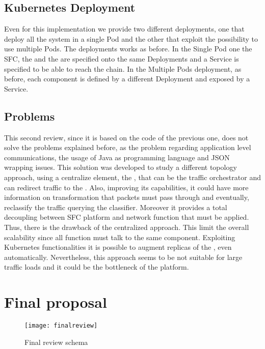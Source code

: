 \subsection{Kubernetes Deployment}
Even for this implementation we provide two different deployments, one that
deploy all the system in a single Pod and the other that exploit the possibility
to use multiple Pods. The deployments works as before. In the Single Pod one the
SFC, the \enchainer{} and the \dispatcher{} are specified onto the same
Deployments and a Service is specified to be able to reach the chain. In the
Multiple Pods deployment, as before, each component is defined by a different
Deployment and exposed by a Service.

\subsection{Problems}
This second review, since it is based on the code of the previous one, does not
solve the problems explained before, as the problem regarding application
level communications, the usage of Java as programming language and JSON
wrapping issues. This solution was developed to study a different topology
approach, using a centralize element, the \dispatcher{}, that can be the traffic
orchestrator and can redirect traffic to the \vnfs{}. Also, improving its
capabilities, it could have more information on transformation that packets must
pass through and eventually, reclassify the traffic querying the classifier.
Moreover it provides a total decoupling between SFC platform and network
function that must be applied. Thus, there is the drawback of the centralized
approach. This limit the overall scalability since all function must talk to the
same component. Exploiting Kubernetes functionalities it is possible to augment
replicas of the \dispatcher{}, even automatically. Nevertheless, this approach
seems to be not suitable for large traffic loads and it could be the bottleneck
of the platform.

\section{Final proposal}

\begin{figure}
  \centering
  \texttt{[image: finalreview]}
  \caption{Final review schema}
  \label{chap:impl:img:finalreview}
\end{figure}

